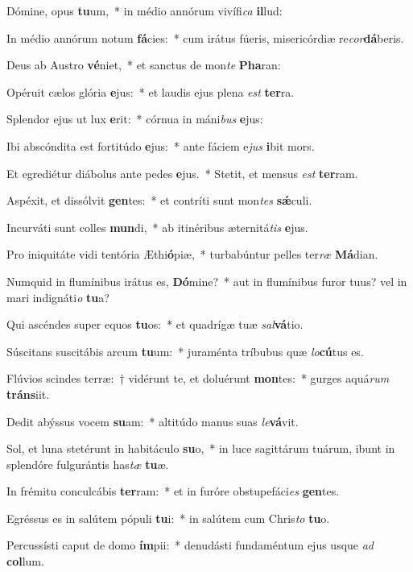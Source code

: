 \item Dómine, opus \textbf{tu}um,~* in médio annórum vivífi\textit{ca} \textbf{il}lud:
\item In médio annórum notum \textbf{fá}cies:~* cum irátus fúeris, misericórdiæ re\textit{cor}\textbf{dá}beris.
\item Deus ab Austro \textbf{vé}niet,~* et sanctus de mon\textit{te} \textbf{Pha}ran:
\item Opéruit cælos glória \textbf{e}jus:~* et laudis ejus plena \textit{est} \textbf{ter}ra.
\item Splendor ejus ut lux \textbf{e}rit:~* córnua in máni\textit{bus} \textbf{e}jus:
\item Ibi abscóndita est fortitúdo \textbf{e}jus:~* ante fáciem e\textit{jus} \textbf{i}bit mors.
\item Et egrediétur diábolus ante pedes \textbf{e}jus.~* Stetit, et mensus \textit{est} \textbf{ter}ram.
\item Aspéxit, et dissólvit \textbf{gen}tes:~* et contríti sunt mon\textit{tes} \textbf{sǽ}culi.
\item Incurváti sunt colles \textbf{mun}di,~* ab itinéribus æternitá\textit{tis} \textbf{e}jus.
\item Pro iniquitáte vidi tentória Æthi\textbf{ó}piæ,~* turbabúntur pelles ter\textit{ræ} \textbf{Má}dian.
\item Numquid in flumínibus irátus es, \textbf{Dó}mine?~* aut in flumínibus furor tuus? vel in mari indignáti\textit{o} \textbf{tu}a?
\item Qui ascéndes super equos \textbf{tu}os:~* et quadrígæ tuæ \textit{sal}\textbf{vá}tio.
\item Súscitans suscitábis arcum \textbf{tu}um:~* juraménta tríbubus quæ \textit{lo}\textbf{cú}tus es.
\item Flúvios scindes terræ:~† vidérunt te, et doluérunt \textbf{mon}tes:~* gurges aquá\textit{rum} \textbf{tráns}iit.
\item Dedit abýssus vocem \textbf{su}am:~* altitúdo manus suas \textit{le}\textbf{vá}vit.
\item Sol, et luna stetérunt in habitáculo \textbf{su}o,~* in luce sagittárum tuárum, ibunt in splendóre fulgurántis has\textit{tæ} \textbf{tu}æ.
\item In frémitu conculcábis \textbf{ter}ram:~* et in furóre obstupefáci\textit{es} \textbf{gen}tes.
\item Egréssus es in salútem pópuli \textbf{tu}i:~* in salútem cum Chris\textit{to} \textbf{tu}o.
\item Percussísti caput de domo \textbf{ím}pii:~* denudásti fundaméntum ejus usque \textit{ad} \textbf{col}lum.
